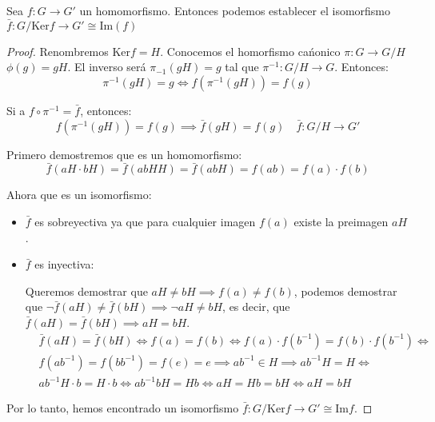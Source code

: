 \begin{thm}
    Sea $f:G \to G'$ un homomorfismo. Entonces podemos establecer el isomorfismo $\bar{f}:G / \text{Ker} f \to G' \cong \text{Im}(f)$   
\end{thm}

\begin{proof}
    Renombremos $\text{Ker} f=H$. Conocemos el homorfismo cańonico $\pi : G \to G / H$ $\phi(g) = gH$. El inverso será $\pi_{-1} (gH) = g$ tal que $\pi^{-1}: G / H \to G$. Entonces:
    \begin{equation}
        \pi^{-1}(gH) = g \iff f(\pi^{-1}(gH)) = f(g)
    \end{equation}

    Si a $f \circ \pi^{-1} = \bar{f}$, entonces:
    \begin{equation}
        f(\pi^{-1}(gH)) = f(g) \implies \bar{f}(gH) = f(g) \quad \bar{f}: G / H \to G'
    \end{equation}

    Primero demostremos que es un homomorfismo:
    \begin{equation}
        \bar{f} (aH \cdot bH) = \bar{f} (abHH) = \bar{f}(abH) = f(ab) = f(a) \cdot f(b)
    \end{equation}

    Ahora que es un isomorfismo:
    \begin{itemize}
        \item $\bar{f}$ es sobreyectiva ya que para cualquier imagen $f(a)$ existe la preimagen $aH$.
        \item $\bar{f}$ es inyectiva:

            Queremos demostrar que $aH \neq bH \implies f(a) \neq f(b)$, podemos demostrar que $\neg \bar{f}(aH) \neq \bar{f}(bH) \implies \neg aH \neq bH$, es decir, que $\bar{f}(aH) = \bar{f}(bH) \implies aH = bH$.
        \begin{equation}
            \begin{split}
                & \bar{f}(aH) = \bar{f}(bH) \iff f(a) = f(b) \iff f(a) \cdot f(b^{-1}) = f(b) \cdot f(b^{-1}) \iff\\
                & f(ab^{-1}) = f(bb^{-1}) = f(e) = e \implies ab^{-1} \in H \implies ab^{-1}H = H \iff\\
                & ab^{-1}H\cdot b = H\cdot b \iff ab^{-1}bH = Hb \iff aH = Hb = bH \iff aH = bH   
            \end{split}
        \end{equation}
    \end{itemize}

    Por lo tanto, hemos encontrado un isomorfismo $\bar{f}: G / \text{Ker} f \to G' \cong \text{Im} f$.
\end{proof}

